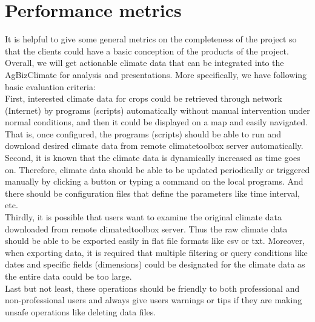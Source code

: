 \documentclass[letterpaper,10pt]{article}
\begin{document}
	  \section*{Performance metrics}
    It is helpful to give some general metrics on the completeness of the project so that the clients could have a basic conception of the products of the project. Overall, we will get actionable climate data that can be integrated into the AgBizClimate for analysis and presentations. More specifically, we have following basic evaluation criteria:\\
    
    First, interested climate data for crops could be retrieved through network (Internet) by programs (scripts) automatically without manual intervention under normal conditions, and then it could be displayed on a map and easily navigated. That is, once configured, the programs (scripts) should be able to run and download desired climate data from remote climatetoolbox server automatically.\\
    
    Second, it is known that the climate data is dynamically increased as time goes on. Therefore, climate data should be able to be updated periodically or triggered manually by clicking a button or typing a command on the local programs. And there should be configuration files that define the parameters like time interval, etc.\\
    
    Thirdly, it is possible that users want to examine the original climate data downloaded from remote climatedtoolbox server. Thus the raw climate data should be able to be exported easily in flat file formats like csv or txt. Moreover, when exporting data, it is required that multiple filtering or query conditions like dates and specific fields (dimensions) could be designated for the climate data as the entire data could be too large.\\
    
    Last but not least, these operations should be friendly to both professional and non-professional users and always give users warnings or tips if they are making unsafe operations like deleting data files.
\end{document}
